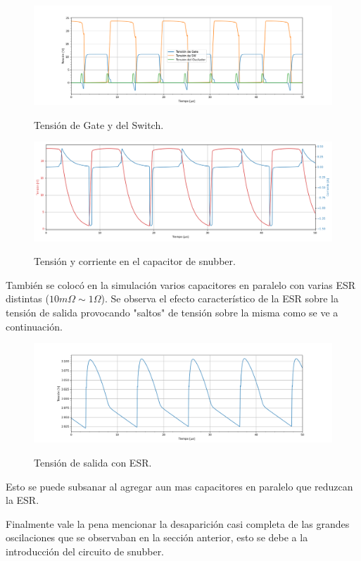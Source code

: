 \begin{figure}[H]
	\centering
	\includegraphics[width=\linewidth]{ImagenesParteIII/TensionesVarias1.png}
	\label{fig:tensionesvarias}
	\caption{Tensión de Gate y del Switch.}
\end{figure}
\begin{figure}[H]
	\centering
	\includegraphics[width=0.9\linewidth]{ImagenesParteIII/Cap_snub.png}
	\label{fig:tensionsVsnubIII}
	\caption{Tensión y corriente en el capacitor de snubber.}
\end{figure}
También se colocó en la simulación varios capacitores en paralelo con varias ESR distintas ($10m\Omega \sim 1 \Omega$). Se observa el efecto característico de la ESR sobre la tensión de salida provocando "saltos" de tensión sobre la misma como se ve a continuación.
\begin{figure}[H]
	\centering
	\includegraphics[width=0.9\linewidth]{ImagenesParteIII/Vout_esr.png}
	\label{fig:tensionESR}
	\caption{Tensión de salida con ESR.}
\end{figure}
Esto se puede subsanar al agregar aun mas capacitores en paralelo que reduzcan la ESR.

Finalmente vale la pena mencionar la desaparición casi completa de las grandes oscilaciones que se observaban en la sección anterior, esto se debe a la introducción del circuito de snubber.

%